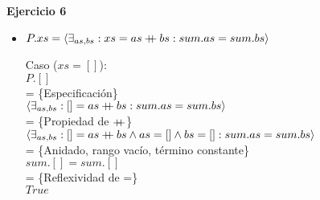 \documentclass[12pt]{article}
\newcommand{\concat}{%
  \mathbin{{+}\mspace{-8mu}{+}}%
}
\begin{document}
\textbf{Ejercicio 6}

\begin{itemize}
    \item $ P.xs = \langle\exists_{as,bs} : xs = as \concat bs : sum.as = sum.bs \rangle $

    \bigbreak

    Caso ($xs = []$):\\
    $ P.[] $\\
    = \{Especificación\}\\
    $ \langle\exists_{as,bs} : [] = as \concat bs : sum.as = sum.bs \rangle $\\
    = \{Propiedad de $\concat$\}\\
    $ \langle\exists_{as,bs} : [] = as \concat bs \land as = [] \land bs = [] : sum.as = sum.bs \rangle $\\
    = \{Anidado, rango vacío, término constante\}\\
    $ sum.[] = sum.[] $\\
    = \{Reflexividad de =\}\\
    $ True $\\

    \bigbreak


\end{itemize}
\end{document}
